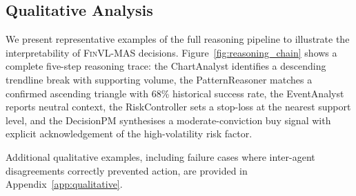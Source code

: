 \subsection{Qualitative Analysis}

We present representative examples of the full reasoning pipeline to illustrate the interpretability of \textsc{FinVL-MAS} decisions. Figure~\ref{fig:reasoning_chain} shows a complete five-step reasoning trace: the ChartAnalyst identifies a descending trendline break with supporting volume, the PatternReasoner matches a confirmed ascending triangle with 68\% historical success rate, the EventAnalyst reports neutral context, the RiskController sets a stop-loss at the nearest support level, and the DecisionPM synthesises a moderate-conviction buy signal with explicit acknowledgement of the high-volatility risk factor.


Additional qualitative examples, including failure cases where inter-agent disagreements correctly prevented action, are provided in Appendix~\ref{app:qualitative}.
